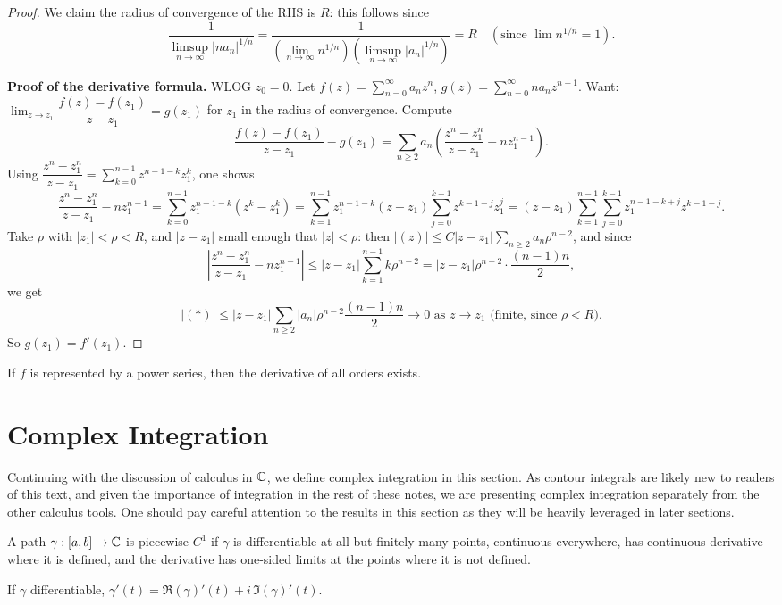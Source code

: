\documentclass[11pt]{article}
\begin{document}
\begin{proof}
We claim the radius of convergence of the RHS is $R$: this follows since
\[
\frac{1}{\limsup_{n\to\infty}|na_n|^{1/n}} = \frac{1}{\left(\lim_{n\to\infty} n^{1/n}\right)\left(\limsup_{n\to\infty}|a_n|^{1/n}\right)} = R \quad (\text{since } \lim n^{1/n}=1).
\]

\textbf{Proof of the derivative formula.} WLOG $z_0=0$. Let $f(z) = \sum_{n=0}^\infty a_nz^n$, $g(z) = \sum_{n=0}^\infty na_nz^{n-1}$. Want: $\lim_{z\to z_1} \dfrac{f(z)-f(z_1)}{z-z_1} = g(z_1)$ for $z_1$ in the radius of convergence. Compute
\[
\frac{f(z)-f(z_1)}{z-z_1} - g(z_1) = \sum_{n\ge 2} a_n\left(\frac{z^n-z_1^n}{z-z_1} - nz_1^{n-1}\right).
\]
Using $\dfrac{z^n-z_1^n}{z-z_1} = \sum_{k=0}^{n-1}z^{n-1-k}z_1^k$, one shows
\[
\frac{z^n-z_1^n}{z-z_1} - nz_1^{n-1} = \sum_{k=0}^{n-1}z_1^{n-1-k}(z^k-z_1^k) = \sum_{k=1}^{n-1}z_1^{n-1-k}(z-z_1)\sum_{j=0}^{k-1}z^{k-1-j}z_1^j = (z-z_1)\sum_{k=1}^{n-1}\sum_{j=0}^{k-1}z_1^{n-1-k+j}z^{k-1-j}.
\]
Take $\rho$ with $|z_1| < \rho < R$, and $|z-z_1|$ small enough that $|z| < \rho$: then $|(z)| \le C|z-z_1|\sum_{n\ge2} a_n\rho^{n-2}$, and since
\[
\left|\frac{z^n-z_1^n}{z-z_1}-nz_1^{n-1}\right| \le |z-z_1|\sum_{k=1}^{n-1}k\rho^{n-2} = |z-z_1|\rho^{n-2}\cdot \frac{(n-1)n}{2},
\]
we get
\[
|(*)| \le |z-z_1|\sum_{n\ge2}|a_n|\rho^{n-2}\frac{(n-1)n}{2} \to 0 \text{ as } z \to z_1 \text{ (finite, since } \rho<R\text{)}.
\]
So $g(z_1) = f'(z_1)$.
\end{proof}

\begin{corollary}
If $f$ is represented by a power series, then the derivative of all orders exists.
\end{corollary}

\newpage
\section{Complex Integration}

Continuing with the discussion of calculus in ${\mathbb{C}}$, we define complex integration in this section. As contour integrals are likely new to readers of this text, and given the importance of integration in the rest of these notes, we are presenting complex integration separately from the other calculus tools. One should pay careful attention to the results in this section as they will be heavily leveraged in later sections.

\begin{definition}
A path $\gamma:[a,b] \to {\mathbb{C}}$ is piecewise-$C^1$ if $\gamma$ is differentiable at all but finitely many points, continuous everywhere, has continuous derivative where it is defined, and the derivative has one-sided limits at the points where it is not defined.
\end{definition}
If $\gamma$ differentiable, $\gamma'(t) = \Re(\gamma)'(t) + i\,\Im(\gamma)'(t)$.
\end{document}
